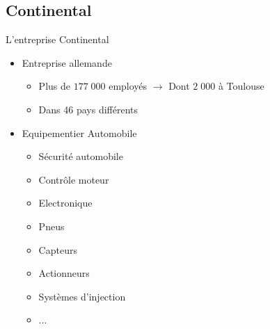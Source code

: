 \documentclass{beamer}
\begin{document}
\subsection{Continental}
\begin{frame}{L'entreprise Continental}

	\begin{itemize}
		\item Entreprise allemande
			\begin{itemize}
				\item Plus de $177\;000$ employés\newline
				$\rightarrow$ Dont $2\;000$ à Toulouse
				\item Dans 46 pays différents
			\end{itemize}
			\vfill	
			\pause
		\item Equipementier Automobile
			\begin{itemize}
				\item Sécurité automobile 
				\item Contrôle moteur
				\item Electronique
				\item Pneus
				\item Capteurs
				\item Actionneurs
				\item Systèmes d'injection				
				\item ...
				
			\end{itemize}
	\end{itemize}
\end{frame}
\end{document}
